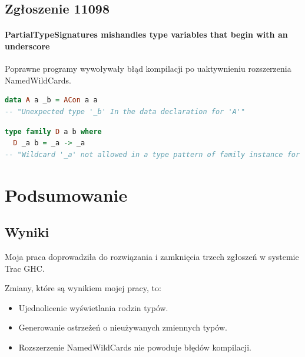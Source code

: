 \documentclass[polish]{beamer}
\makeatletter
\newcommand*{\currentname}{\@currentlabelname}
\makeatother
\begin{document}
\subsection{Zgłoszenie 11098} %
\begin{frame}[t,fragile]{\currentname}
    \framesubtitle{PartialTypeSignatures mishandles type variables that begin with an underscore}

Poprawne programy wywoływały błąd kompilacji po uaktywnieniu rozszerzenia NamedWildCards.    
\begin{block}{}
\begin{lstlisting}[language=Haskell,basicstyle=\tiny\ttfamily]
data A a _b = ACon a a 
-- "Unexpected type '_b' In the data declaration for 'A'"
\end{lstlisting}
\end{block}

\begin{block}{}
\begin{lstlisting}[language=Haskell,basicstyle=\tiny\ttfamily]
type family D a b where 
  D _a b = _a -> _a
-- "Wildcard '_a' not allowed in a type pattern of family instance for 'D'"
\end{lstlisting}
\end{block}
\end{frame}

\section{Podsumowanie} %

\subsection{Wyniki} %
\begin{tframe}{\currentname}
Moja praca doprowadziła do rozwiązania i zamknięcia trzech zgłoszeń w systemie Trac GHC.

\hfill \break
Zmiany, które są wynikiem mojej pracy, to:
    \begin{itemize}
        \item Ujednolicenie wyświetlania rodzin typów.
        \item Generowanie ostrzeżeń o nieużywanych zmiennych typów.
        \item Rozszerzenie NamedWildCards nie powoduje błędów kompilacji.
    \end{itemize}

\end{tframe}
\end{document}

